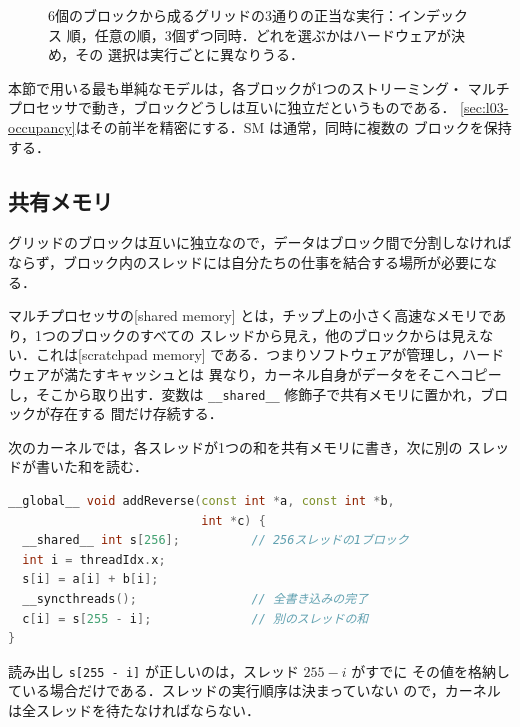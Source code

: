 \documentclass[../main.tex]{subfiles}
\begin{document}
\begin{figure}[tb]
  \centering
  
  \caption{6個のブロックから成るグリッドの3通りの正当な実行：インデックス
    順，任意の順，3個ずつ同時．どれを選ぶかはハードウェアが決め，その
    選択は実行ごとに異なりうる．}
  \label{fig:l03-block-order}
\end{figure}

本節で用いる最も単純なモデルは，各ブロックが1つのストリーミング・
マルチプロセッサで動き，ブロックどうしは互いに独立だというものである．
\cref{sec:l03-occupancy}はその前半を精密にする．SM は通常，同時に複数の
ブロックを保持する．

\subsection{共有メモリ}

グリッドのブロックは互いに独立なので，データはブロック間で分割しなければ
ならず，ブロック内のスレッドには自分たちの仕事を結合する場所が必要になる．

\begin{definition}[共有メモリ]
  マルチプロセッサの[shared memory]
  とは，チップ上の小さく高速なメモリであり，1つのブロックのすべての
  スレッドから見え，他のブロックからは見えない．これは[scratchpad memory]
  である．つまりソフトウェアが管理し，ハードウェアが満たすキャッシュとは
  異なり，カーネル自身がデータをそこへコピーし，そこから取り出す．変数は
  \texttt{\_\_shared\_\_} 修飾子で共有メモリに置かれ，ブロックが存在する
  間だけ存続する．
\end{definition}

次のカーネルでは，各スレッドが1つの和を共有メモリに書き，次に別の
スレッドが書いた和を読む．
\begin{lstlisting}[language=C++, numbers=none]
__global__ void addReverse(const int *a, const int *b,
                           int *c) {
  __shared__ int s[256];          // 256スレッドの1ブロック
  int i = threadIdx.x;
  s[i] = a[i] + b[i];
  __syncthreads();                // 全書き込みの完了
  c[i] = s[255 - i];              // 別のスレッドの和
}
\end{lstlisting}
読み出し \texttt{s[255 - i]} が正しいのは，スレッド $255-i$ がすでに
その値を格納している場合だけである．スレッドの実行順序は決まっていない
ので，カーネルは全スレッドを待たなければならない．
\end{document}
